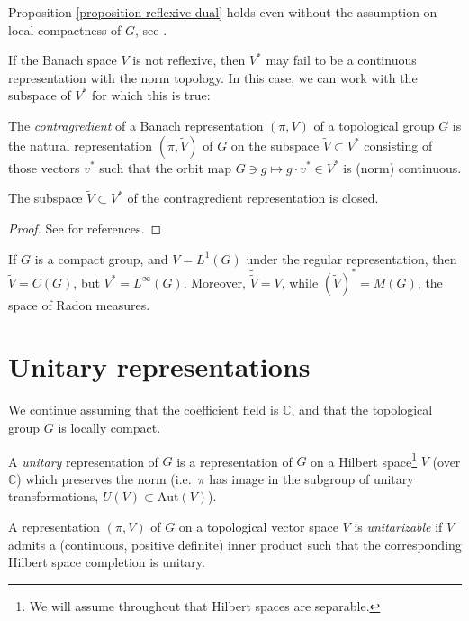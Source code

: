 \begin{remark}
\label{remark-dualcontinuous-withoutcompactness}
 Proposition  \ref{proposition-reflexive-dual}
 holds even without the assumption on local compactness of $G$, see \cite[Corollary 6.9]{Megrelishvili}.
\end{remark}

If the Banach space $V$ is not reflexive, then $V^*$ may fail to be a continuous representation with the norm topology. In this case, we can work with the subspace of $V^*$ for which this is true:

\begin{definition}
 \label{definition-contragredient}
The {\it contragredient} of a Banach representation $(\pi, V)$ of a topological group $G$ is the natural representation $(\tilde\pi, \tilde V)$ of $G$ on the subspace $\tilde V\subset V^*$ consisting of those vectors $v^*$ such that the orbit map $G\ni g\mapsto g\cdot v^* \in V^*$ is (norm) continuous. 
\end{definition}


\begin{lemma}
 \label{lemma-contragredient}
The subspace $\tilde V\subset V^*$ of the contragredient representation is closed. 
\end{lemma}

\begin{proof}
 See \cite[\S 3.1]{Bernstein-Kroetz} for references. 
\end{proof}

\begin{example}
 \label{example-contragredient}
If $G$ is a compact group, and $V=L^1(G)$ under the regular representation, then $\tilde V = C(G)$, but $V^*=L^\infty(G)$. Moreover, $\tilde{\tilde V} = V$, while $(\tilde V)^* = M(G)$, the space of Radon measures.
\end{example}




\section{Unitary representations}
\label{section-unitary-representations}

We continue assuming that the coefficient field is $\mathbb C$, and that the topological group $G$ is locally compact.


\begin{definition}
\label{definition-unitary-representation}
A {\it unitary} representation of $G$ is a representation of $G$ on a Hilbert space\footnote{We will assume throughout that Hilbert spaces are separable.} $V$ (over $\mathbb C$) which preserves the norm (i.e.\ $\pi$ has image in the subgroup of unitary transformations, $U(V)\subset \text{Aut}(V)$). 

A representation $(\pi,V)$ of $G$ on a topological vector space $V$ is {\it unitarizable} if $V$ admits a (continuous, positive definite) inner product such that the corresponding Hilbert space completion is unitary.
\end{definition}

